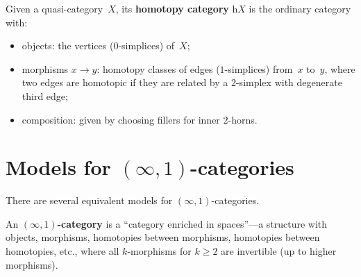 \begin{definition}\label{def:homotopy-cat-qcat}
Given a quasi-category~$X$, its \textbf{homotopy category} $\mathrm{h}X$
is the ordinary category with:
\begin{itemize}
\item objects: the vertices ($0$-simplices) of~$X$;
\item morphisms $x\to y$: homotopy classes of edges ($1$-simplices)
      from~$x$ to~$y$, where two edges are homotopic if they are
      related by a $2$-simplex with degenerate third edge;
\item composition: given by choosing fillers for inner $2$-horns.
\end{itemize}
\end{definition}



\section{Models for $(\infty,1)$-categories}\label{sec:models-infty1}


There are several equivalent models for $(\infty,1)$-categories.

\begin{definition}\label{def:infty1-informal}
An \textbf{$(\infty,1)$-category} is a ``category enriched in spaces''---a
structure with objects, morphisms, homotopies between morphisms,
homotopies between homotopies, etc., where all $k$-morphisms for $k\ge 2$
are invertible (up to higher morphisms).
\end{definition}

